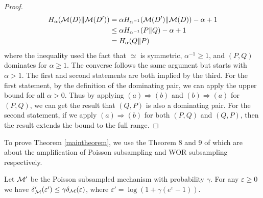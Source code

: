 \documentclass{article}
\begin{document}
\begin{lemma}
\begin{proof}
\begin{align*}
        H_\alpha({\mathcal{M}}(D) \Vert {\mathcal{M}}(D')) &= \alpha H_{\alpha^{-1}}({\mathcal{M}}(D') \Vert {\mathcal{M}}(D)) - \alpha + 1\\ &\le \alpha H_{\alpha^{-1}}(P \Vert Q) - \alpha + 1\\
        &= H_\alpha(Q \Vert P)
    \end{align*}
where the inequality used the fact that $\simeq$ is symmetric, $\alpha^{-1} \ge 1$, and $(P,Q)$ dominates for $\alpha \ge 1$. The converse follows the same argument but starts with $\alpha > 1$. 
The first and second statements are both implied by the third. For the first statement, by the definition of the dominating pair, we can apply the upper bound for all $\alpha > 0$. Thus by applying $(a) \Rightarrow (b)$ and $(b) \Rightarrow (a)$ for $(P,Q)$, we can get the result that $(Q,P)$ is also a dominating pair. 
For the second statement, if we apply $(a) \Rightarrow (b)$ for both $(P,Q)$ and $(Q,P)$, then the result extends the bound to the full range.
    \end{proof}
    \end{lemma}
To prove Theorem \ref{maintheorem}, we use the Theorem 8 and 9 of \cite{balle2018privacy} which are about  the amplification of Poisson subsampling and WOR subsampling respectively.
\begin{theorem}
    Let ${\mathcal{M}}'$ be the Poisson subsampled mechanism with probability $\gamma$. For any $\varepsilon \ge 0$ we have $\delta_{\mathcal{M}}'(\varepsilon') \le \gamma \delta_{\mathcal{M}}(\varepsilon)$, where $\varepsilon' = \log(1+\gamma(e^\varepsilon - 1))$.  
\end{theorem}
\end{document}
